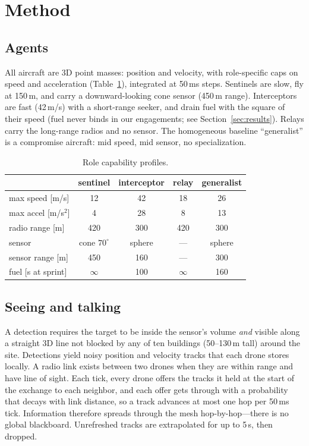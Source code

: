 \documentclass[10pt,twocolumn]{article}
\begin{document}
\section{Method}
\subsection{Agents}
All aircraft are 3D point masses: position and velocity, with role-specific
caps on speed and acceleration (Table~\ref{tab:roles}), integrated at
50\,ms steps. Sentinels are slow, fly at 150\,m, and carry a
downward-looking cone sensor (450\,m range). Interceptors are fast
(42\,m/s) with a short-range seeker, and drain fuel with the square of
their speed (fuel never binds in our engagements; see
Section~\ref{sec:results}). Relays carry the long-range radios and no sensor. The
homogeneous baseline ``generalist'' is a compromise aircraft: mid speed,
mid sensor, no specialization.

\begin{table}[t]
\centering\small
\setlength{\tabcolsep}{3pt}
\begin{tabular}{lcccc}
\toprule
 & sentinel & interceptor & relay & generalist \\
\midrule
max speed [m/s] & 12 & 42 & 18 & 26 \\
max accel [m/s$^2$] & 4 & 28 & 8 & 13 \\
radio range [m] & 420 & 300 & 420 & 300 \\
sensor & cone $70^\circ$ & sphere & --- & sphere \\
sensor range [m] & 450 & 160 & --- & 300 \\
fuel [s at sprint] & $\infty$ & 100 & $\infty$ & 160 \\
\bottomrule
\end{tabular}
\caption{Role capability profiles.}
\label{tab:roles}
\end{table}

\subsection{Seeing and talking}
A detection requires the target to be inside the sensor's volume \emph{and}
visible along a straight 3D line not blocked by any of ten buildings
(50--130\,m tall) around the site. Detections yield noisy position and
velocity tracks that each drone stores locally. A radio link exists between
two drones when they are within range and have line of sight. Each tick,
every drone offers the tracks it held at the start of the exchange to each
neighbor, and each offer gets through with a probability that decays with
link distance, so a track advances at most one hop per 50\,ms tick. Information therefore spreads through the mesh
hop-by-hop---there is no global blackboard. Unrefreshed tracks are
extrapolated for up to 5\,s, then dropped.
\end{document}

